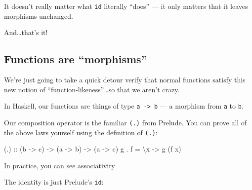 \documentclass[]{article}
\newenvironment{Shaded}{}{}
\newcommand{\DataTypeTok}[1]{\textcolor[rgb]{0.56,0.13,0.00}{{#1}}}
\newcommand{\DecValTok}[1]{\textcolor[rgb]{0.25,0.63,0.44}{{#1}}}
\newcommand{\OtherTok}[1]{\textcolor[rgb]{0.00,0.44,0.13}{{#1}}}
\newcommand{\FunctionTok}[1]{\textcolor[rgb]{0.02,0.16,0.49}{{#1}}}
\newcommand{\NormalTok}[1]{{#1}}
\begin{document}
It doesn't really matter what \texttt{id} literally ``does'' --- it only matters
that it leaves morphisms unchanged.

And\ldots{}that's it!

\subsection{\texorpdfstring{Functions are
``morphisms''}{Functions are morphisms}}\label{functions-are-morphisms}

We're just going to take a quick detour verify that normal functions satisfy
this new notion of ``function-likeness''\ldots{}so that we aren't crazy.

In Haskell, our functions are things of type \texttt{a\ -\textgreater{}\ b} ---
a morphism from \texttt{a} to \texttt{b}.

Our composition operator is the familiar \texttt{(.)} from Prelude. You can
prove all of the above laws yourself using the definition of \texttt{(.)}:

\begin{Shaded}
\begin{Highlighting}[]
\OtherTok{(.) ::} \NormalTok{(b }\OtherTok{->} \NormalTok{c) }\OtherTok{->} \NormalTok{(a }\OtherTok{->} \NormalTok{b) }\OtherTok{->} \NormalTok{(a }\OtherTok{->} \NormalTok{c)}
\NormalTok{g }\FunctionTok{.} \NormalTok{f }\FunctionTok{=} \NormalTok{\textbackslash{}x }\OtherTok{->} \NormalTok{g (f x)}
\end{Highlighting}
\end{Shaded}

In practice, you can see associativity

\begin{Shaded}
\end{Shaded}

The identity is just Prelude's \texttt{id}:
\end{document}
